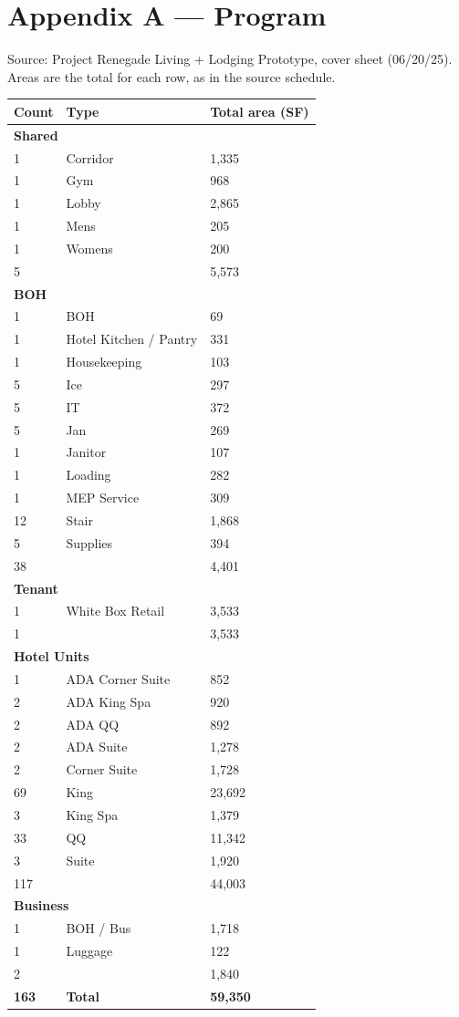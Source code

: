 \documentclass[10pt]{article}
\begin{document}
\section*{Appendix A --- Program}
Source: Project Renegade Living + Lodging Prototype, cover sheet (06/20/25). Areas are the total for each row, as in the source schedule.
\begin{longtable}{p{1.4cm}p{9.5cm}p{3cm}}\toprule \textbf{Count} & \textbf{Type} & \textbf{Total area (SF)} \\ \midrule \endhead
\multicolumn{3}{l}{\textbf{Shared}} \\
1 & Corridor & 1,335 \\
1 & Gym & 968 \\
1 & Lobby & 2,865 \\
1 & Mens & 205 \\
1 & Womens & 200 \\
\midrule 5 & & 5,573 \\
\multicolumn{3}{l}{\textbf{BOH}} \\
1 & BOH & 69 \\
1 & Hotel Kitchen / Pantry & 331 \\
1 & Housekeeping & 103 \\
5 & Ice & 297 \\
5 & IT & 372 \\
5 & Jan & 269 \\
1 & Janitor & 107 \\
1 & Loading & 282 \\
1 & MEP Service & 309 \\
12 & Stair & 1,868 \\
5 & Supplies & 394 \\
\midrule 38 & & 4,401 \\
\multicolumn{3}{l}{\textbf{Tenant}} \\
1 & White Box Retail & 3,533 \\
\midrule 1 & & 3,533 \\
\multicolumn{3}{l}{\textbf{Hotel Units}} \\
1 & ADA Corner Suite & 852 \\
2 & ADA King Spa & 920 \\
2 & ADA QQ & 892 \\
2 & ADA Suite & 1,278 \\
2 & Corner Suite & 1,728 \\
69 & King & 23,692 \\
3 & King Spa & 1,379 \\
33 & QQ & 11,342 \\
3 & Suite & 1,920 \\
\midrule 117 & & 44,003 \\
\multicolumn{3}{l}{\textbf{Business}} \\
1 & BOH / Bus & 1,718 \\
1 & Luggage & 122 \\
\midrule 2 & & 1,840 \\
\midrule \textbf{163} & \textbf{Total} & \textbf{59,350} \\
\bottomrule\end{longtable}
\end{document}

